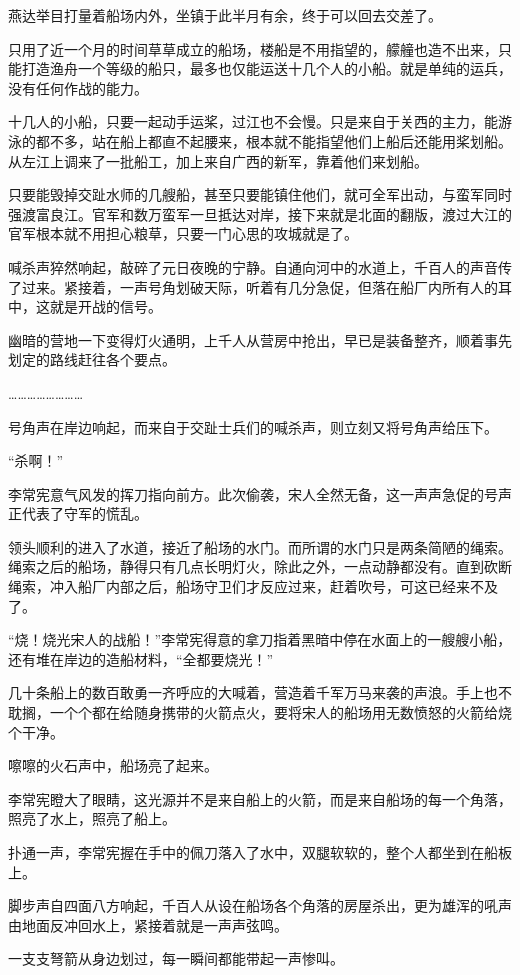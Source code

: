 燕达举目打量着船场内外，坐镇于此半月有余，终于可以回去交差了。

只用了近一个月的时间草草成立的船场，楼船是不用指望的，艨艟也造不出来，只能打造渔舟一个等级的船只，最多也仅能运送十几个人的小船。就是单纯的运兵，没有任何作战的能力。

十几人的小船，只要一起动手运桨，过江也不会慢。只是来自于关西的主力，能游泳的都不多，站在船上都直不起腰来，根本就不能指望他们上船后还能用桨划船。从左江上调来了一批船工，加上来自广西的新军，靠着他们来划船。

只要能毁掉交趾水师的几艘船，甚至只要能镇住他们，就可全军出动，与蛮军同时强渡富良江。官军和数万蛮军一旦抵达对岸，接下来就是北面的翻版，渡过大江的官军根本就不用担心粮草，只要一门心思的攻城就是了。

喊杀声猝然响起，敲碎了元日夜晚的宁静。自通向河中的水道上，千百人的声音传了过来。紧接着，一声号角划破天际，听着有几分急促，但落在船厂内所有人的耳中，这就是开战的信号。

幽暗的营地一下变得灯火通明，上千人从营房中抢出，早已是装备整齐，顺着事先划定的路线赶往各个要点。

……………………

号角声在岸边响起，而来自于交趾士兵们的喊杀声，则立刻又将号角声给压下。

“杀啊！”

李常宪意气风发的挥刀指向前方。此次偷袭，宋人全然无备，这一声声急促的号声正代表了守军的慌乱。

领头顺利的进入了水道，接近了船场的水门。而所谓的水门只是两条简陋的绳索。绳索之后的船场，静得只有几点长明灯火，除此之外，一点动静都没有。直到砍断绳索，冲入船厂内部之后，船场守卫们才反应过来，赶着吹号，可这已经来不及了。

“烧！烧光宋人的战船！”李常宪得意的拿刀指着黑暗中停在水面上的一艘艘小船，还有堆在岸边的造船材料，“全都要烧光！”

几十条船上的数百敢勇一齐呼应的大喊着，营造着千军万马来袭的声浪。手上也不耽搁，一个个都在给随身携带的火箭点火，要将宋人的船场用无数愤怒的火箭给烧个干净。

嚓嚓的火石声中，船场亮了起来。

李常宪瞪大了眼睛，这光源并不是来自船上的火箭，而是来自船场的每一个角落，照亮了水上，照亮了船上。

扑通一声，李常宪握在手中的佩刀落入了水中，双腿软软的，整个人都坐到在船板上。

脚步声自四面八方响起，千百人从设在船场各个角落的房屋杀出，更为雄浑的吼声由地面反冲回水上，紧接着就是一声声弦鸣。

一支支弩箭从身边划过，每一瞬间都能带起一声惨叫。

